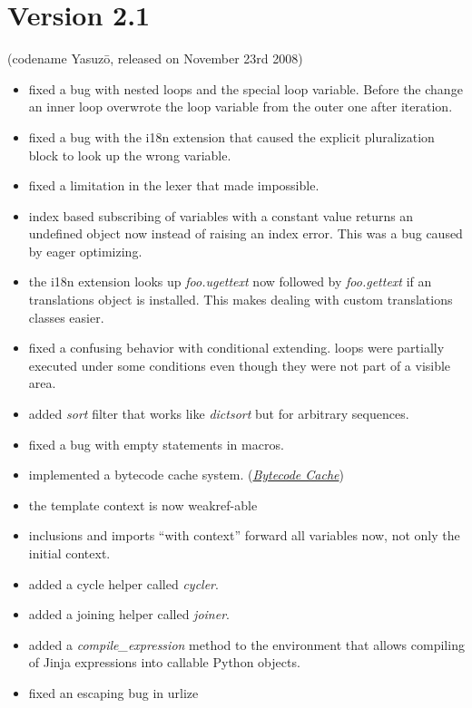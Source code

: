 \documentclass[a4paper,10pt,english]{sphinxmanual}
\begin{document}
\section{Version 2.1}
\label{changelog:version-2-1}
(codename Yasuzō, released on November 23rd 2008)
\begin{itemize}
\item {} 
fixed a bug with nested loops and the special loop variable.  Before the
change an inner loop overwrote the loop variable from the outer one after
iteration.

\item {} 
fixed a bug with the i18n extension that caused the explicit pluralization
block to look up the wrong variable.

\item {} 
fixed a limitation in the lexer that made  impossible.

\item {} 
index based subscribing of variables with a constant value returns an
undefined object now instead of raising an index error.  This was a bug
caused by eager optimizing.

\item {} 
the i18n extension looks up \emph{foo.ugettext} now followed by \emph{foo.gettext}
if an translations object is installed.  This makes dealing with custom
translations classes easier.

\item {} 
fixed a confusing behavior with conditional extending.  loops were partially
executed under some conditions even though they were not part of a visible
area.

\item {} 
added \emph{sort} filter that works like \emph{dictsort} but for arbitrary sequences.

\item {} 
fixed a bug with empty statements in macros.

\item {} 
implemented a bytecode cache system.  ({\hyperref[api:bytecode-cache]{\emph{Bytecode Cache}}})

\item {} 
the template context is now weakref-able

\item {} 
inclusions and imports ``with context'' forward all variables now, not only
the initial context.

\item {} 
added a cycle helper called \emph{cycler}.

\item {} 
added a joining helper called \emph{joiner}.

\item {} 
added a \emph{compile\_expression} method to the environment that allows compiling
of Jinja expressions into callable Python objects.

\item {} 
fixed an escaping bug in urlize

\end{itemize}
\end{document}
